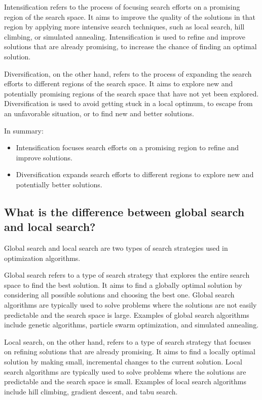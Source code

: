\documentclass[conference]{IEEEtran}
\begin{document}
Intensification refers to the process of focusing search efforts on a promising region of the search space. It aims to improve the quality of the solutions in that region by applying more intensive search techniques, such as local search, hill climbing, or simulated annealing. Intensification is used to refine and improve solutions that are already promising, to increase the chance of finding an optimal solution.

Diversification, on the other hand, refers to the process of expanding the search efforts to different regions of the search space. It aims to explore new and potentially promising regions of the search space that have not yet been explored. Diversification is used to avoid getting stuck in a local optimum, to escape from an unfavorable situation, or to find new and better solutions.

In summary:
\begin{itemize}
	\item Intensification focuses search efforts on a promising region to refine and improve solutions.
	\item Diversification expands search efforts to different regions to explore new and potentially better solutions.
\end{itemize}

\subsection{What is the difference between global search and local search?}
Global search and local search are two types of search strategies used in optimization algorithms.

Global search refers to a type of search strategy that explores the entire search space to find the best solution. It aims to find a globally optimal solution by considering all possible solutions and choosing the best one. Global search algorithms are typically used to solve problems where the solutions are not easily predictable and the search space is large. Examples of global search algorithms include genetic algorithms, particle swarm optimization, and simulated annealing.

Local search, on the other hand, refers to a type of search strategy that focuses on refining solutions that are already promising. It aims to find a locally optimal solution by making small, incremental changes to the current solution. Local search algorithms are typically used to solve problems where the solutions are predictable and the search space is small. Examples of local search algorithms include hill climbing, gradient descent, and tabu search.
\end{document}
